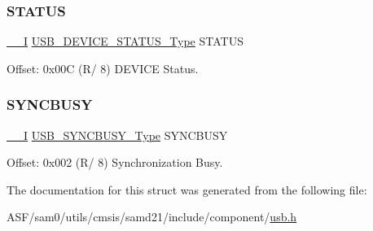 \subsubsection{\texorpdfstring{STATUS}{STATUS}}
{\footnotesize\ttfamily \mbox{\hyperlink{core__cm0plus_8h_af63697ed9952cc71e1225efe205f6cd3}{\+\_\+\+\_\+I}} \mbox{\hyperlink{union_u_s_b___d_e_v_i_c_e___s_t_a_t_u_s___type}{U\+S\+B\+\_\+\+D\+E\+V\+I\+C\+E\+\_\+\+S\+T\+A\+T\+U\+S\+\_\+\+Type}} S\+T\+A\+T\+US}



Offset\+: 0x00C (R/ 8) D\+E\+V\+I\+CE Status. 

\mbox{\label{struct_usb_device_a207c0e2e615d2c9a63a3cd1f81d252f7}} 
\subsubsection{\texorpdfstring{SYNCBUSY}{SYNCBUSY}}
{\footnotesize\ttfamily \mbox{\hyperlink{core__cm0plus_8h_af63697ed9952cc71e1225efe205f6cd3}{\+\_\+\+\_\+I}} \mbox{\hyperlink{union_u_s_b___s_y_n_c_b_u_s_y___type}{U\+S\+B\+\_\+\+S\+Y\+N\+C\+B\+U\+S\+Y\+\_\+\+Type}} S\+Y\+N\+C\+B\+U\+SY}



Offset\+: 0x002 (R/ 8) Synchronization Busy. 



The documentation for this struct was generated from the following file\+:\begin{DoxyCompactItemize}
\item 
A\+S\+F/sam0/utils/cmsis/samd21/include/component/\mbox{\hyperlink{component_2usb_8h}{usb.\+h}}\end{DoxyCompactItemize}
